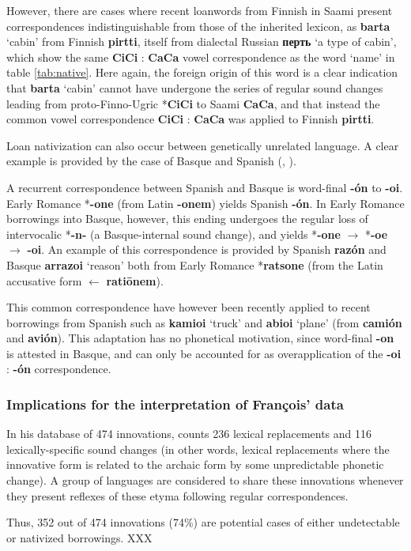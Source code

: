 \documentclass[oneside,a4paper,11pt]{article}
\newcommand{\ipa}[1]{\textbf{{\phon\mbox{#1}}}} %
\begin{document}
However, there are cases where recent loanwords from Finnish in Saami present correspondences indistinguishable from those of the inherited lexicon, as \ipa{barta} `cabin' from Finnish \ipa{pirtti}, itself from dialectal Russian \ipa{перть} `a type of cabin', which show the same \ipa{CiCi} : \ipa{CaCa} vowel correspondence as the word `name' in table \ref{tab:native}. Here again, the foreign origin of this word is a clear indication that \ipa{barta} `cabin' cannot have undergone the series of regular sound changes leading from proto-Finno-Ugric *\ipa{CiCi} to Saami \ipa{CaCa}, and that instead the common vowel correspondence \ipa{CiCi} : \ipa{CaCa} was applied to Finnish \ipa{pirtti}.

 


Loan nativization can also occur between genetically unrelated language. A clear example is provided by the case of Basque and Spanish (\citealt[53-54]{trask00chronology}, \citealt[21-3]{aikio06nativization}). 

A recurrent correspondence between Spanish and Basque is word-final \ipa{-ón} to \ipa{-oi}. Early Romance *\ipa{-one} (from Latin \ipa{-onem}) yields Spanish \ipa{-ón}. In Early Romance borrowings into Basque, however, this ending undergoes the regular loss of intervocalic *\ipa{-n-} (a Basque-internal sound change), and yields *\ipa{-one} $\rightarrow$ *\ipa{-oe} $\rightarrow$ \ipa{-oi}. An example of this correspondence is provided by Spanish \ipa{razón} and Basque \ipa{arrazoi} `reason' both from Early Romance *\ipa{ratsone} (from the Latin accusative form $\leftarrow$ \ipa{ratiōnem}).

This common correspondence have however been recently applied to recent borrowings from Spanish such as \ipa{kamioi} `truck' and \ipa{abioi} `plane' (from \ipa{camión} and \ipa{avión}). This adaptation has no phonetical motivation, since word-final \ipa{-on} is attested in Basque, and can only be accounted for as overapplication of the \ipa{-oi} : \ipa{-ón} correspondence.

\subsubsection{Implications for the interpretation of François' data}
In his database of 474 innovations, \citet[177]{francois15tree} counts 236 lexical replacements and 116 lexically-specific sound changes (in other words, lexical replacements where the innovative form is related to the archaic form by some unpredictable phonetic change). A group of languages are considered to share these innovations whenever they present reflexes of these etyma following regular correspondences.

Thus, 352 out of 474 innovations (74\%) are potential cases of either undetectable or nativized borrowings. XXX





 
\end{document}

